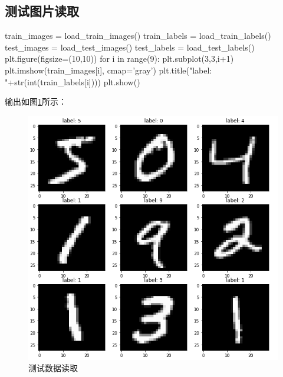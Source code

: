 \subsection{测试图片读取}
\begin{python}
  train_images = load_train_images()
  train_labels = load_train_labels()
  test_images = load_test_images()
  test_labels = load_test_labels()
  plt.figure(figsize=(10,10))
  for i in range(9):
      plt.subplot(3,3,i+1)
      plt.imshow(train_images[i], cmap='gray')
      plt.title("label: "+str(int(train_labels[i])))
  plt.show()
\end{python}
输出如图\ref{fig:ch0loaddatatest}所示：
\begin{figure}[thbp!]
  \centering
  \includegraphics[width=0.3\linewidth]{figure/Ch0Mnist/loaddatatest.png}
  \caption{测试数据读取}
  \label{fig:ch0loaddatatest}
\end{figure}






